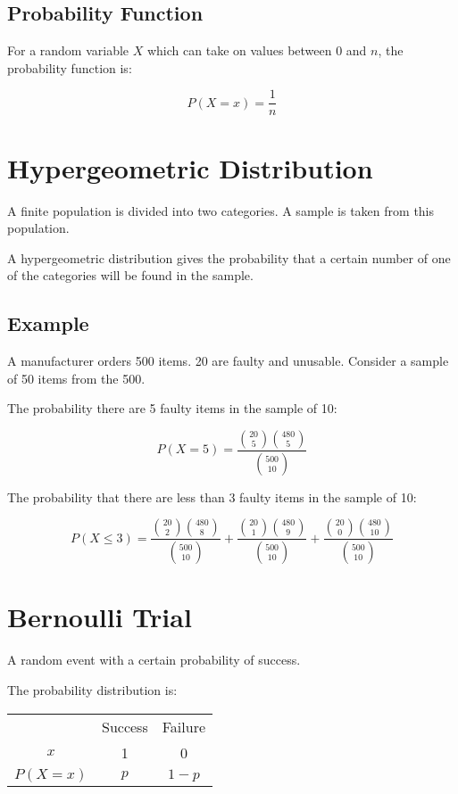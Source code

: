 \documentclass[a4paper,11pt]{article}
\begin{document}
\subsection{Probability Function}

For a random variable $X$ which can take on values between 0 and $n$, the
probability function is:

$$
P(X = x) = \frac{1}{n}
$$




\section{Hypergeometric Distribution}

A finite population is divided into two categories. A sample is taken from this
population.

A hypergeometric distribution gives the probability that a certain number of
one of the categories will be found in the sample.


\subsection{Example}

A manufacturer orders 500 items. 20 are faulty and unusable. Consider a sample
of 50 items from the 500.

The probability there are 5 faulty items in the sample of 10:

$$
P(X = 5) = \frac{\binom{20}{5} \binom{480}{5}}{\binom{500}{10}}
$$

The probability that there are less than 3 faulty items in the sample of 10:

$$
P(X \leq 3) = \frac{\binom{20}{2} \binom{480}{8}}{\binom{500}{10}} +
\frac{\binom{20}{1} \binom{480}{9}}{\binom{500}{10}} +
\frac{\binom{20}{0} \binom{480}{10}}{\binom{500}{10}}
$$




\section{Bernoulli Trial}

A random event with a certain probability of success.

The probability distribution is:

\begin{center}
\begin{tabular}{c|c|c}
& Success & Failure \\
$x$ & 1 & 0 \\
\hline
$P(X = x)$ & $p$ & $1 - p$ \\
\end{tabular}
\end{center}
\end{document}
